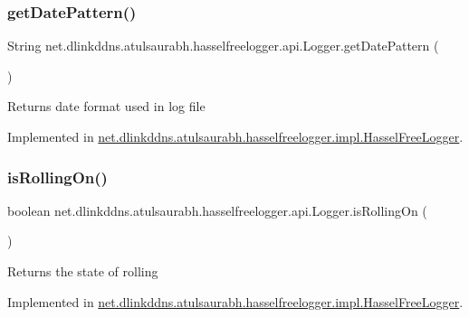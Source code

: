 \subsubsection{\texorpdfstring{get\+Date\+Pattern()}{getDatePattern()}}
{\footnotesize\ttfamily String net.\+dlinkddns.\+atulsaurabh.\+hasselfreelogger.\+api.\+Logger.\+get\+Date\+Pattern (\begin{DoxyParamCaption}{ }\end{DoxyParamCaption})}

\begin{DoxyReturn}{Returns}
date format used in log file 
\end{DoxyReturn}


Implemented in \mbox{\hyperlink{classnet_1_1dlinkddns_1_1atulsaurabh_1_1hasselfreelogger_1_1impl_1_1_hassel_free_logger_a9b56e6059627b493e8f5ebff888795a0}{net.\+dlinkddns.\+atulsaurabh.\+hasselfreelogger.\+impl.\+Hassel\+Free\+Logger}}.

\mbox{\label{interfacenet_1_1dlinkddns_1_1atulsaurabh_1_1hasselfreelogger_1_1api_1_1_logger_a3815e1c6e6688af733cd8d098891c6da}} 
\subsubsection{\texorpdfstring{is\+Rolling\+On()}{isRollingOn()}}
{\footnotesize\ttfamily boolean net.\+dlinkddns.\+atulsaurabh.\+hasselfreelogger.\+api.\+Logger.\+is\+Rolling\+On (\begin{DoxyParamCaption}{ }\end{DoxyParamCaption})}

\begin{DoxyReturn}{Returns}
the state of rolling 
\end{DoxyReturn}


Implemented in \mbox{\hyperlink{classnet_1_1dlinkddns_1_1atulsaurabh_1_1hasselfreelogger_1_1impl_1_1_hassel_free_logger_a1264dcefa68828985aa843e545ff41b6}{net.\+dlinkddns.\+atulsaurabh.\+hasselfreelogger.\+impl.\+Hassel\+Free\+Logger}}.

